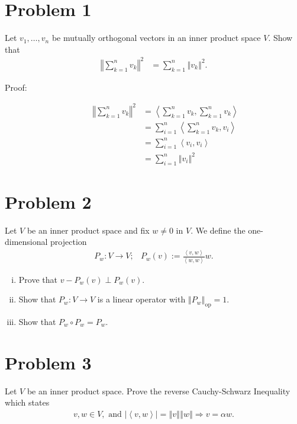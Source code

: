 \documentclass[8pt]{extarticle}
\title{}
\author{}
\date{}
\newcommand{\iprod}[2]{\left\langle #1,#2\right\rangle}
\newcommand{\norm}[1]{\left\Vert #1\right\Vert}
\begin{document}
  \section{Problem 1}%
  Let $v_1,\dots,v_n$ be mutually orthogonal vectors in an inner product space $V$. Show that
  \begin{align*}
    \norm{\sum_{k=1}^{n}v_k}^2 &= \sum_{k=1}^{n}\norm{v_k}^2.
  \end{align*}
  \begin{description}
    \item[Proof:]
      \begin{align*}
        \norm{\sum_{k=1}^{n}v_k}^2 &=\iprod{\sum_{k=1}^{n}v_k}{\sum_{k=1}^{n}v_k} \\
                                   &= \sum_{i=1}^{n}\iprod{\sum_{k=1}^{n}v_k}{v_i}\\
                                   &= \sum_{i=1}^{n}\iprod{v_i}{v_i}\tag*{since for $i\neq j$, $\iprod{v_i}{v_j} = 0$}\\
                                   &= \sum_{i=1}^{n}\norm{v_i}^2
      \end{align*}
  \end{description}
  \section{Problem 2}%
  Let $V$ be an inner product space and fix $w\neq 0$ in $V$. We define the one-dimensional projection
  \begin{align*}
    P_w: V\rightarrow V;&P_w(v) := \frac{\iprod{v}{w}}{\iprod{w}{w}}w.
  \end{align*}
  \begin{enumerate}[(i)]
    \item Prove that $v-P_w(v)\perp P_w(v)$.
    \item Show that $P_w:V\rightarrow V$ is a linear operator with $\norm{P_w}_{\text{op}} = 1$.
    \item Show that $P_w\circ P_w = P_w$.
  \end{enumerate}
  \section{Problem 3}%
  Let $V$ be an inner product space. Prove the reverse Cauchy-Schwarz Inequality which states
  \begin{align*}
    v,w\in V,\text{ and } |\iprod{v}{w}| = \norm{v}\norm{w} \Rightarrow v = \alpha w.
  \end{align*}
\end{document}
